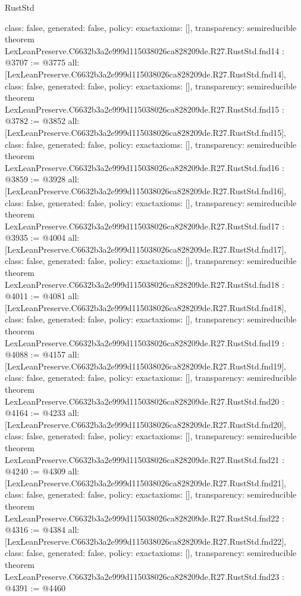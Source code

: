 \begin{lexlean}{RustStd}
\begin{coremodule}
{  class: false,
  generated: false,
  policy: exact{axioms: []},
  transparency: semireducible
}
theorem LexLeanPreserve.C6632b3a2e999d115038026ca828209de.R27.RustStd.fnd14 : @3707 := @3775 {
  all: [LexLeanPreserve.C6632b3a2e999d115038026ca828209de.R27.RustStd.fnd14],
  class: false,
  generated: false,
  policy: exact{axioms: []},
  transparency: semireducible
}
theorem LexLeanPreserve.C6632b3a2e999d115038026ca828209de.R27.RustStd.fnd15 : @3782 := @3852 {
  all: [LexLeanPreserve.C6632b3a2e999d115038026ca828209de.R27.RustStd.fnd15],
  class: false,
  generated: false,
  policy: exact{axioms: []},
  transparency: semireducible
}
theorem LexLeanPreserve.C6632b3a2e999d115038026ca828209de.R27.RustStd.fnd16 : @3859 := @3928 {
  all: [LexLeanPreserve.C6632b3a2e999d115038026ca828209de.R27.RustStd.fnd16],
  class: false,
  generated: false,
  policy: exact{axioms: []},
  transparency: semireducible
}
theorem LexLeanPreserve.C6632b3a2e999d115038026ca828209de.R27.RustStd.fnd17 : @3935 := @4004 {
  all: [LexLeanPreserve.C6632b3a2e999d115038026ca828209de.R27.RustStd.fnd17],
  class: false,
  generated: false,
  policy: exact{axioms: []},
  transparency: semireducible
}
theorem LexLeanPreserve.C6632b3a2e999d115038026ca828209de.R27.RustStd.fnd18 : @4011 := @4081 {
  all: [LexLeanPreserve.C6632b3a2e999d115038026ca828209de.R27.RustStd.fnd18],
  class: false,
  generated: false,
  policy: exact{axioms: []},
  transparency: semireducible
}
theorem LexLeanPreserve.C6632b3a2e999d115038026ca828209de.R27.RustStd.fnd19 : @4088 := @4157 {
  all: [LexLeanPreserve.C6632b3a2e999d115038026ca828209de.R27.RustStd.fnd19],
  class: false,
  generated: false,
  policy: exact{axioms: []},
  transparency: semireducible
}
theorem LexLeanPreserve.C6632b3a2e999d115038026ca828209de.R27.RustStd.fnd20 : @4164 := @4233 {
  all: [LexLeanPreserve.C6632b3a2e999d115038026ca828209de.R27.RustStd.fnd20],
  class: false,
  generated: false,
  policy: exact{axioms: []},
  transparency: semireducible
}
theorem LexLeanPreserve.C6632b3a2e999d115038026ca828209de.R27.RustStd.fnd21 : @4240 := @4309 {
  all: [LexLeanPreserve.C6632b3a2e999d115038026ca828209de.R27.RustStd.fnd21],
  class: false,
  generated: false,
  policy: exact{axioms: []},
  transparency: semireducible
}
theorem LexLeanPreserve.C6632b3a2e999d115038026ca828209de.R27.RustStd.fnd22 : @4316 := @4384 {
  all: [LexLeanPreserve.C6632b3a2e999d115038026ca828209de.R27.RustStd.fnd22],
  class: false,
  generated: false,
  policy: exact{axioms: []},
  transparency: semireducible
}
theorem LexLeanPreserve.C6632b3a2e999d115038026ca828209de.R27.RustStd.fnd23 : @4391 := @4460 {
}
\end{coremodule}
\end{lexlean}
